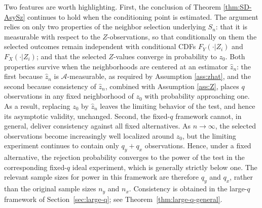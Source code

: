 \documentclass[11pt]{article}
\numberwithin{equation}{section}
\begin{document}
Two features are worth highlighting. First, the conclusion of Theorem \ref{thm:SD-AsySz} continues to hold when the conditioning point is estimated. The argument relies on only two properties of the neighbor selection underlying $S_n$: that it is measurable with respect to the $Z$-observations, so that conditionally on them the selected outcomes remain independent with conditional CDFs $F_Y(\cdot|Z_i)$ and $F_X(\cdot|Z_i)$; and that the selected $Z$-values converge in probability to $z_0$. Both properties survive when the neighborhoods are centered at an estimator $\hat z_n$: the first because $\hat z_n$ is $\mathcal A$-measurable, as required by Assumption \ref{ass:zhat}, and the second because consistency of $\hat z_n$, combined with Assumption \ref{ass:Z}, places $q$ observations in any fixed neighborhood of $z_0$ with probability approaching one. As a result, replacing $z_0$ by $\hat z_n$ leaves the limiting behavior of the test, and hence its asymptotic validity, unchanged. Second, the fixed-$q$ framework cannot, in general, deliver consistency against all fixed alternatives. As $n\to\infty$, the selected observations become increasingly well localized around $z_0$, but the limiting experiment continues to contain only $q_y+q_x$ observations. Hence, under a fixed alternative, the rejection probability converges to the power of the test in the corresponding fixed-$q$ ideal experiment, which is generally strictly below one. The relevant sample sizes for power in this framework are therefore $q_y$ and $q_x$, rather than the original sample sizes $n_y$ and $n_x$. Consistency is obtained in the large-$q$ framework of Section~\ref{sec:large-q}; see Theorem~\ref{thm:large-q-general}.
\end{document}
